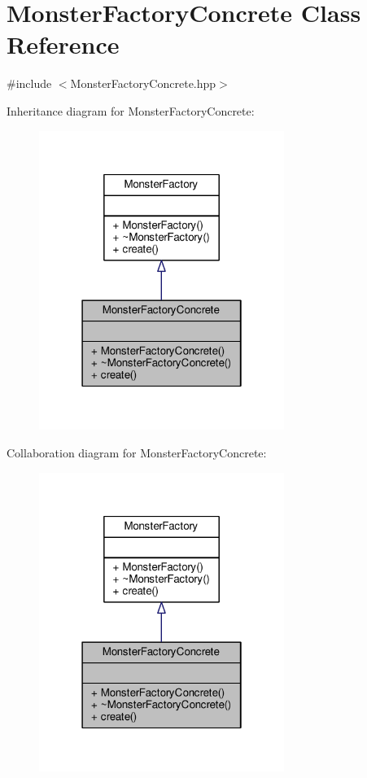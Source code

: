 \hypertarget{class_monster_factory_concrete}{\section{Monster\-Factory\-Concrete Class Reference}
\label{class_monster_factory_concrete}
}


{\ttfamily \#include $<$Monster\-Factory\-Concrete.\-hpp$>$}



Inheritance diagram for Monster\-Factory\-Concrete\-:\nopagebreak
\begin{figure}[H]
\begin{center}
\leavevmode
\includegraphics[width=226pt]{class_monster_factory_concrete__inherit__graph}
\end{center}
\end{figure}


Collaboration diagram for Monster\-Factory\-Concrete\-:\nopagebreak
\begin{figure}[H]
\begin{center}
\leavevmode
\includegraphics[width=226pt]{class_monster_factory_concrete__coll__graph}
\end{center}
\end{figure}
